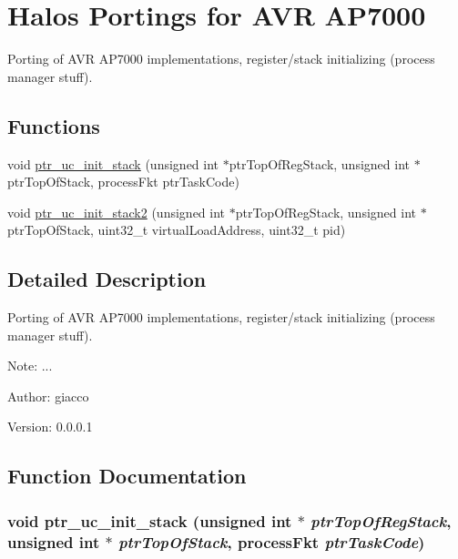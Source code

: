 \hypertarget{group___p_o_r_t_i_n_g_s_a_p7000}{
\section{Halos Portings for AVR AP7000}
\label{group___p_o_r_t_i_n_g_s_a_p7000}
}
Porting of AVR AP7000 implementations, register/stack initializing (process manager stuff).  


\subsection*{Functions}
\begin{CompactItemize}
\item 
void \hyperlink{group___p_o_r_t_i_n_g_s_a_p7000_g8a59b14b092df2468062b4083839ec54}{ptr\_\-uc\_\-init\_\-stack} (unsigned int $\ast$ptrTopOfRegStack, unsigned int $\ast$ptrTopOfStack, processFkt ptrTaskCode)
\item 
void \hyperlink{group___p_o_r_t_i_n_g_s_a_p7000_g3f08a8875f9050ca642a553fb7a59bb2}{ptr\_\-uc\_\-init\_\-stack2} (unsigned int $\ast$ptrTopOfRegStack, unsigned int $\ast$ptrTopOfStack, uint32\_\-t virtualLoadAddress, uint32\_\-t pid)
\end{CompactItemize}


\subsection{Detailed Description}
Porting of AVR AP7000 implementations, register/stack initializing (process manager stuff). 

\begin{Desc}
\item[Note:]... \end{Desc}
\begin{Desc}
\item[Author:]giacco \end{Desc}
\begin{Desc}
\item[Version:]0.0.0.1 \end{Desc}


\subsection{Function Documentation}
\hypertarget{group___p_o_r_t_i_n_g_s_a_p7000_g8a59b14b092df2468062b4083839ec54}{
\subsubsection[{ptr\_\-uc\_\-init\_\-stack}]{\setlength{\rightskip}{0pt plus 5cm}void ptr\_\-uc\_\-init\_\-stack (unsigned int $\ast$ {\em ptrTopOfRegStack}, \/  unsigned int $\ast$ {\em ptrTopOfStack}, \/  processFkt {\em ptrTaskCode})}}
\label{group___p_o_r_t_i_n_g_s_a_p7000_g8a59b14b092df2468062b4083839ec54}


